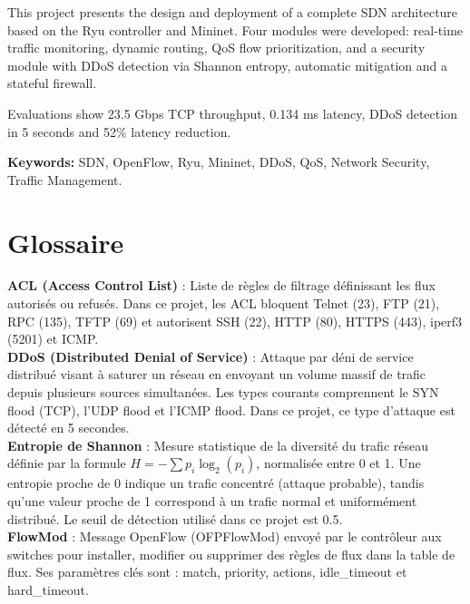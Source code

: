 \documentclass[12pt,a4paper]{report}
\begin{document}
This project presents the design and deployment of a complete
SDN architecture based on the Ryu controller and Mininet.
Four modules were developed: real-time traffic monitoring,
dynamic routing, QoS flow prioritization, and a security
module with DDoS detection via Shannon entropy, automatic
mitigation and a stateful firewall.

Evaluations show 23.5 Gbps TCP throughput, 0.134 ms latency,
DDoS detection in 5 seconds and 52\% latency reduction.

\textbf{Keywords:} SDN, OpenFlow, Ryu, Mininet, DDoS, QoS,
Network Security, Traffic Management.
\newpage

\tableofcontents
\newpage
\listoffigures
{}
\newpage
\listoftables
{}
\newpage

\chapter*{Glossaire}

\textbf{ACL (Access Control List)} : Liste de règles de
filtrage définissant les flux autorisés ou refusés. Dans
ce projet, les ACL bloquent Telnet (23), FTP (21), RPC
(135), TFTP (69) et autorisent SSH (22), HTTP (80),
HTTPS (443), iperf3 (5201) et ICMP.\\[0.3cm]

\textbf{DDoS (Distributed Denial of Service)} : Attaque
par déni de service distribué visant à saturer un réseau
en envoyant un volume massif de trafic depuis plusieurs
sources simultanées. Les types courants comprennent le
SYN flood (TCP), l'UDP flood et l'ICMP flood. Dans ce
projet, ce type d'attaque est détecté en 5 secondes.\\[0.3cm]

\textbf{Entropie de Shannon} : Mesure statistique de la
diversité du trafic réseau définie par la formule
$H = -\sum p_i \log_2(p_i)$, normalisée entre 0 et 1.
Une entropie proche de 0 indique un trafic concentré
(attaque probable), tandis qu'une valeur proche de 1
correspond à un trafic normal et uniformément distribué.
Le seuil de détection utilisé dans ce projet est 0.5.\\[0.3cm]

\textbf{FlowMod} : Message OpenFlow (OFPFlowMod) envoyé
par le contrôleur aux switches pour installer, modifier
ou supprimer des règles de flux dans la table de flux.
Ses paramètres clés sont : match, priority, actions,
idle\_timeout et hard\_timeout.\\[0.3cm]
\end{document}
